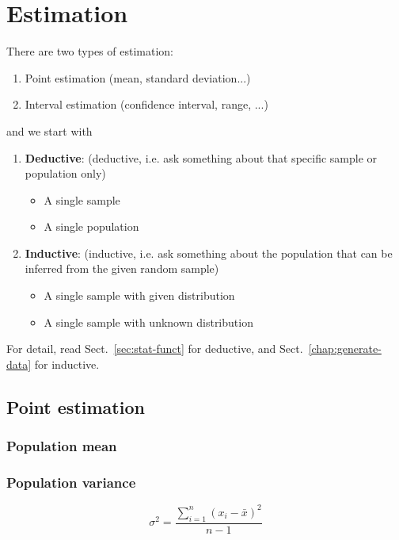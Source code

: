 
\chapter{Estimation}
\label{chap:estimation}

There are two types of estimation:
\begin{enumerate}
\item Point estimation (mean, standard deviation...)
\item Interval estimation (confidence interval, range, ...)
\end{enumerate}
and we start with
\begin{enumerate}
\item {\bf Deductive}: (deductive, i.e. ask something about that
  specific sample or population only)
  \begin{itemize}
  \item A single sample 
  \item A single population
  \end{itemize}
\item {\bf Inductive}: (inductive, i.e. ask something about the
  population that can be inferred from the given random sample)
  \begin{itemize}
  \item A single sample with given distribution 
  \item A single sample with unknown distribution
  \end{itemize}
\end{enumerate}

For detail, read Sect.~\ref{sec:stat-funct} for deductive,  and
Sect.~\ref{chap:generate-data} for inductive. 
\section{Point estimation}
\label{sec:point-estimation}

\subsection{Population mean}
\label{sec:population-mean}


\subsection{Population variance}
\label{sec:population-variance}

\begin{equation*}
  \sigma^2 = \frac{\sum_{i=1}^n (x_i-\bar{x})^2}{n-1}
\end{equation*}

